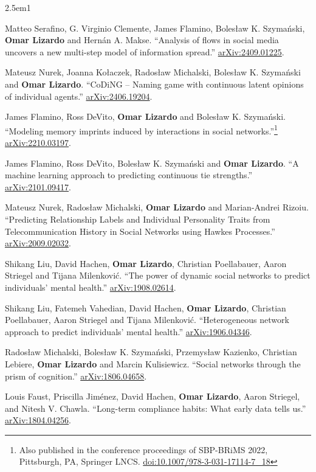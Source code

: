 \documentclass[
]{article}
\newenvironment{cventry}{\begin{hangparas}{2.5em}{1}}{\end{hangparas}}
\begin{document}
\begin{cventry}

Matteo Serafino, G. Virginio Clemente, James Flamino, Bolesław K.
Szymański, \textbf{Omar Lizardo} and Hernán A. Makse. ``Analysis of
flows in social media uncovers a new multi-step model of information
spread.'' \href{https://arxiv.org/abs/2409.01225}{arXiv:2409.01225}.

Mateusz Nurek, Joanna Kołaczek, Radosław Michalski, Bolesław K.
Szymański and \textbf{Omar Lizardo}. ``CoDiNG -- Naming game with
continuous latent opinions of individual agents.''
\href{https://arxiv.org/abs/2406.19204}{arXiv:2406.19204}.

James Flamino, Ross DeVito, \textbf{Omar Lizardo} and Bolesław K.
Szymański. ``Modeling memory imprints induced by interactions in social
networks.''\footnote{Also published in the conference proceedings of
  SBP-BRiMS 2022, Pittsburgh, PA, Springer LNCS.
  \href{https://doi.org/10.1007/978-3-031-17114-7_18}{doi:10.1007/978-3-031-17114-7\_18}}
\href{https://arxiv.org/abs/2210.03197}{arXiv:2210.03197}.

James Flamino, Ross DeVito, Bolesław K. Szymański and \textbf{Omar
Lizardo}. ``A machine learning approach to predicting continuous tie
strengths.'' \href{https://arxiv.org/abs/2101.09417}{arXiv:2101.09417}.

Mateusz Nurek, Radosław Michalski, \textbf{Omar Lizardo} and
Marian-Andrei Rizoiu. ``Predicting Relationship Labels and Individual
Personality Traits from Telecommunication History in Social Networks
using Hawkes Processes.''
\href{https://arxiv.org/abs/2009.02032}{arXiv:2009.02032}.

Shikang Liu, David Hachen, \textbf{Omar Lizardo}, Christian Poellabauer,
Aaron Striegel and Tijana Milenković. ``The power of dynamic social
networks to predict individuals' mental health.''
\href{https://arxiv.org/abs/1908.02614}{arXiv:1908.02614}.

Shikang Liu, Fatemeh Vahedian, David Hachen, \textbf{Omar Lizardo},
Christian Poellabauer, Aaron Striegel and Tijana Milenković.
``Heterogeneous network approach to predict individuals' mental
health.'' \href{https://arxiv.org/abs/1906.04346}{arXiv:1906.04346}.

Radosław Michalski, Bolesław K. Szymański, Przemysław Kazienko,
Christian Lebiere, \textbf{Omar Lizardo} and Marcin Kulisiewicz.
``Social networks through the prism of cognition.''
\href{https://arxiv.org/abs/1806.04658}{arXiv:1806.04658}.

Louis Faust, Priscilla Jiménez, David Hachen, \textbf{Omar Lizardo},
Aaron Striegel, and Nitesh V. Chawla. ``Long-term compliance habits:
What early data tells us.''
\href{https://arxiv.org/abs/1804.04256}{arXiv:1804.04256}.


\end{cventry}
\end{document}
